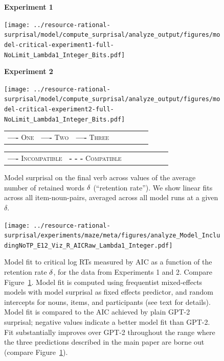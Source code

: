 \begin{figure}
    \centering

	\textbf{Experiment 1}
    
		\texttt{[image: ../resource-rational-surprisal/model/compute\_surprisal/analyze\_output/figures/model-critical-experiment1-full-NoLimit\_Lambda1\_Integer\_Bits.pdf]} %

	\textbf{Experiment 2}


    \texttt{[image: ../resource-rational-surprisal/model/compute\_surprisal/analyze\_output/figures/model-critical-experiment2-full-NoLimit\_Lambda1\_Integer\_Bits.pdf]}


        \begin{tabular}{llllllll}
\textbf{\textcolor{one}{----}} \textsc{One}&
\textbf{\textcolor{two}{----}} \textsc{Two}&
\textbf{\textcolor{three}{----}} \textsc{Three}
\end{tabular}
    
    \begin{tabular}{llllllll}
\textbf{{----}} \textsc{Incompatible}&
\textbf{{- - -}} \textsc{Compatible}
\end{tabular}
    
    
    
   
	\caption{Model surprisal on the final verb across values of the average number of retained words $\delta$ (``retention rate''). We show linear fits across all item-noun-pairs, averaged across all model runs at a given $\delta$.
	}
    \label{fig:model-surprisal}
\end{figure}


\begin{figure}
    \centering


    \texttt{[image: ../resource-rational-surprisal/experiments/maze/meta/figures/analyze\_Model\_IncludingNoTP\_E12\_Viz\_R\_AICRaw\_Lambda1\_Integer.pdf]}


	\caption{Model fit to critical log RTs measured by AIC as a function of the retention rate $\delta$, for the data from Experiments 1 and 2. Compare Figure~\ref{fig:model-surprisal}.
	Model fit is computed using frequentist mixed-effects models with model surprisal as fixed effects predictor, and random intercepts for nouns, items, and participants (see text for details).
	Model fit is compared to the AIC achieved by plain GPT-2 surprisal; negative values indicate a better model fit than GPT-2.
	Fit substantially improves over GPT-2 throughout the range where the three predictions described in the main paper are borne out  (compare Figure~\ref{fig:model-surprisal}).
		}
    \label{fig:fit-critical}
\end{figure}





